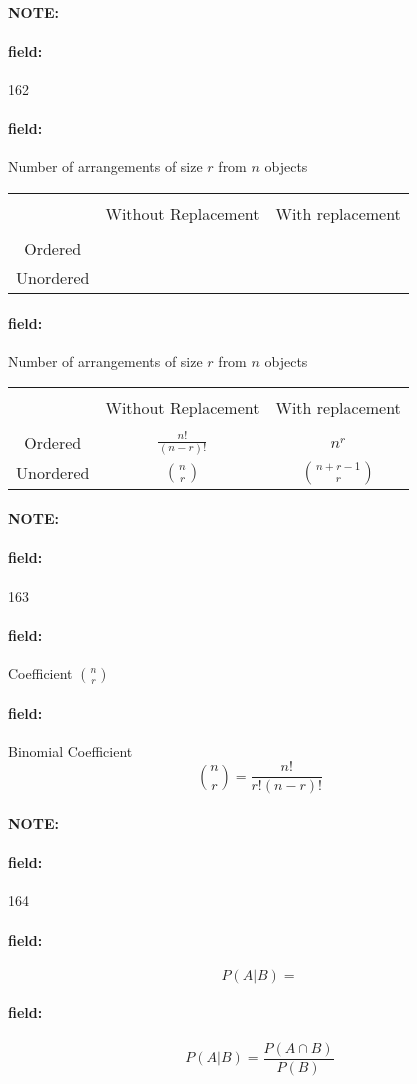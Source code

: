 \documentclass[12pt]{article}
\newenvironment{note}{\paragraph{NOTE:}}{}
\newenvironment{field}{\paragraph{field:}}{}
\begin{document}
\begin{note} \begin{field} \tiny 162 \end{field}
  \begin{field}
    Number of arrangements of size $r$ from $n$ objects

    \begin{tabular}{|c| c c|}
      \hline \\
       & Without Replacement & With replacement\\
       \hline \\
       Ordered & & \\
       Unordered & & \\
       \hline
    \end{tabular}
  \end{field}
  \begin{field}
    Number of arrangements of size $r$ from $n$ objects

    \begin{tabular}{|c| c c|}
      \hline \\
       & Without Replacement & With replacement\\
       \hline \\
       Ordered & $\frac{n!}{(n-r)!}$ & $n^r$ \\
       Unordered & $\binom{n}{r}$& $\binom{n+r-1}{r}$ \\
       \hline
    \end{tabular}
  \end{field}
\end{note}



\begin{note} \begin{field} \tiny 163 \end{field}
    \begin{field}
         Coefficient $\binom{n}{r}$
    \end{field}
    \begin{field}
      Binomial Coefficient
        $$\binom{n}{r} = \frac{n!}{r!(n-r)!}$$
    \end{field}
\end{note}

\begin{note} \begin{field} \tiny 164 \end{field}
  \begin{field}
    $$P(A|B)=$$
  \end{field}
  \begin{field}
    $$ P(A|B) = \frac{P(A \cap B)}{P(B)} $$
  \end{field}
\end{note}
\end{document}
